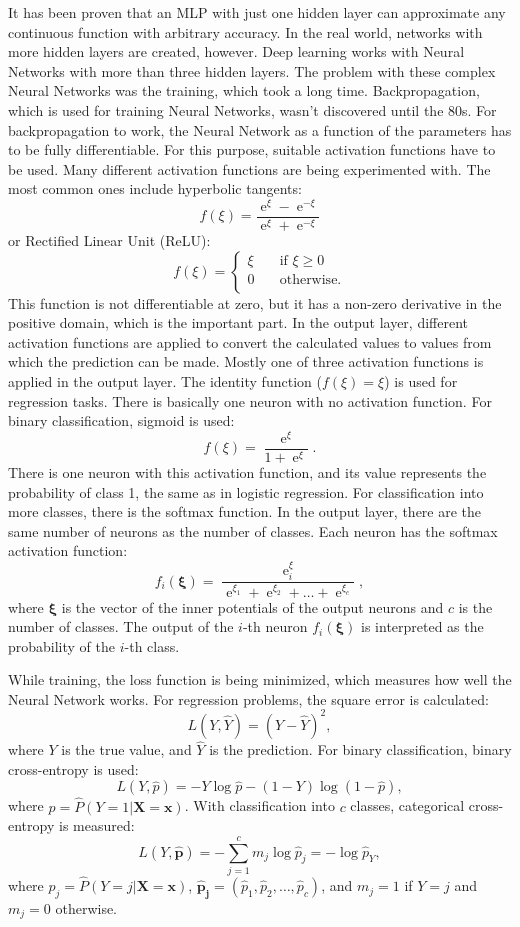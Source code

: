 \documentclass[thesis=M,english]{FITthesis}[2019/12/23]
\newcommand{\e}{\mathop{\mathrm{e}}}
\begin{document}
It has been proven that an MLP with just one hidden layer can approximate any continuous function with arbitrary accuracy. In the real world, networks with more hidden layers are created, however. Deep learning works with Neural Networks with more than three hidden layers. The problem with these complex Neural Networks was the training, which took a long time. Backpropagation, which is used for training Neural Networks, wasn't discovered until the 80s. For backpropagation to work, the Neural Network as a function of the parameters has to be fully differentiable. For this purpose, suitable activation functions have to be used. Many different activation functions are being experimented with. The most common ones include hyperbolic tangents: $$f(\xi) = \frac{\e^\xi - \e^{-\xi}}{\e^\xi + \e^{-\xi}}$$ or Rectified Linear Unit (ReLU):
\[   
f(\xi) = 
     \begin{cases}
       \xi &\quad\text{if } \xi\ge 0\\
       0 &\quad\text{otherwise.}\\
     \end{cases}
\]
This function is not differentiable at zero, but it has a non-zero derivative in the positive domain, which is the important part. In the output layer, different activation functions are applied to convert the calculated values to values from which the prediction can be made. Mostly one of three activation functions is applied in the output layer. The identity function ($f(\xi) = \xi$) is used for regression tasks. There is basically one neuron with no activation function. For binary classification, sigmoid is used: $$f(\xi) = \frac{\e^\xi}{1 + \e^\xi}.$$ There is one neuron with this activation function, and its value represents the probability of class 1, the same as in logistic regression. For classification into more classes, there is the softmax function. In the output layer, there are the same number of neurons as the number of classes. Each neuron has the softmax activation function: $$f_i(\boldsymbol{\xi}) = \frac{\e^\xi_i}{\e^{\xi_1} + \e^{\xi_2} + \dots + \e^{\xi_c}},$$ where $\boldsymbol{\xi}$ is the vector of the inner potentials of the output neurons and $c$ is the number of classes. The output of the $i$-th neuron $f_i(\boldsymbol{\xi})$ is interpreted as the probability of the $i$-th class.

While training, the loss function is being minimized, which measures how well the Neural Network works. For regression problems, the square error is calculated: $$L(Y, \hat{Y}) = (Y - \hat{Y})^2,$$ where $Y$ is the true value, and $\hat{Y}$ is the prediction. For binary classification, binary cross-entropy is used: $$L(Y, \hat{p}) = -Y\log{\hat{p}} - (1 - Y)\log{(1 - \hat{p})},$$ where $\hat{p} = \hat{P}(Y = 1|\boldsymbol{X} = \boldsymbol{x})$. With classification into $c$ classes, categorical cross-entropy is measured: $$L(Y, \hat{\boldsymbol{p}}) = -\sum_{j = 1}^c m_j \log{\hat{p}_j} = -\log{\hat{p}_Y},$$ where $\hat{p}_j = \hat{P}(Y = j|\boldsymbol{X} = \boldsymbol{x})$, $\boldsymbol{\hat{p}_j} = (\hat{p}_1, \hat{p}_2, \dots, \hat{p}_c)$, and $m_j = 1$ if $Y = j$ and $m_j = 0$ otherwise.
\end{document}
